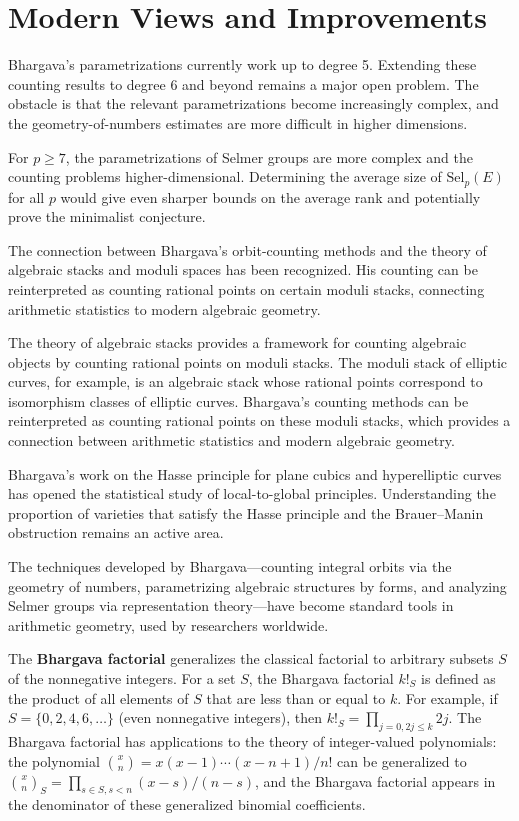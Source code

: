 \section{Modern Views and Improvements}

Bhargava's parametrizations currently work up to degree 5. Extending these counting results to degree 6 and beyond remains a major open problem. The obstacle is that the relevant parametrizations become increasingly complex, and the geometry-of-numbers estimates are more difficult in higher dimensions.

For $p \ge 7$, the parametrizations of Selmer groups are more complex and the counting problems higher-dimensional. Determining the average size of $\mathrm{Sel}_p(E)$ for all $p$ would give even sharper bounds on the average rank and potentially prove the minimalist conjecture.

The connection between Bhargava's orbit-counting methods and the theory of algebraic stacks and moduli spaces has been recognized. His counting can be reinterpreted as counting rational points on certain moduli stacks, connecting arithmetic statistics to modern algebraic geometry.

The theory of algebraic stacks provides a framework for counting algebraic objects by counting rational points on moduli stacks. The moduli stack of elliptic curves, for example, is an algebraic stack whose rational points correspond to isomorphism classes of elliptic curves. Bhargava's counting methods can be reinterpreted as counting rational points on these moduli stacks, which provides a connection between arithmetic statistics and modern algebraic geometry.

Bhargava's work on the Hasse principle for plane cubics and hyperelliptic curves has opened the statistical study of local-to-global principles. Understanding the proportion of varieties that satisfy the Hasse principle and the Brauer--Manin obstruction remains an active area.

The techniques developed by Bhargava---counting integral orbits via the geometry of numbers, parametrizing algebraic structures by forms, and analyzing Selmer groups via representation theory---have become standard tools in arithmetic geometry, used by researchers worldwide.

The \textbf{Bhargava factorial} generalizes the classical factorial to arbitrary subsets $S$ of the nonnegative integers. For a set $S$, the Bhargava factorial $k!_S$ is defined as the product of all elements of $S$ that are less than or equal to $k$. For example, if $S = \{0, 2, 4, 6, \ldots\}$ (even nonnegative integers), then $k!_S = \prod_{j=0, 2j \le k} 2j$. The Bhargava factorial has applications to the theory of integer-valued polynomials: the polynomial $\binom{x}{n} = x(x-1)\cdots(x-n+1)/n!$ can be generalized to $\binom{x}{n}_S = \prod_{s \in S, s < n} (x-s)/(n-s)$, and the Bhargava factorial appears in the denominator of these generalized binomial coefficients.

